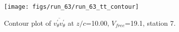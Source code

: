 \begin{figure}[H]
\centering
\texttt{[image: figs/run\_63/run\_63\_tt\_contour]}
\caption{Contour plot of $\overline{v_{\theta}^{\prime} v_{\theta}^{\prime}}$ at $z/c$=10.00, $V_{free}$=19.1, station 7.}
\label{fig:run_63_tt_contour}
\end{figure}


